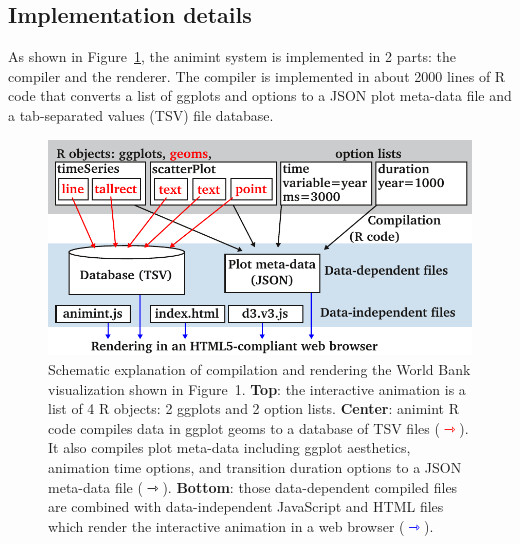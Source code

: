 \documentclass[journal]{vgtc}\usepackage[]{graphicx}\usepackage[]{color}
\begin{document}
\subsection{Implementation details}
\label{sec:implementation}

As shown in Figure~\ref{fig:design}, the animint system is implemented
in 2 parts: the compiler and the renderer. The compiler is implemented in about 
2000 lines of R code that converts a list of ggplots and options to a JSON 
plot meta-data file and a tab-separated values (TSV) file database.

\begin{figure}[htp]
  \centering
  \includegraphics[width=\columnwidth]{figure-design}
  \caption{Schematic explanation of compilation and rendering the
    World Bank visualization shown in Figure~1. \textbf{Top}: the
    interactive animation is a list of 4 R objects: 2 ggplots and 2
    option lists. \textbf{Center}: animint R code compiles data in
    ggplot geoms to a database of TSV files
    (\textcolor{red}{$\rightarrowtriangle$}). It also compiles plot
    meta-data including ggplot aesthetics, animation time
    options, and transition duration options to a JSON meta-data file
    ($\rightarrowtriangle$). \textbf{Bottom}: those data-dependent
    compiled files are combined with data-independent JavaScript and
    HTML files which render the interactive animation in a web browser
    (\textcolor{blue}{$\rightarrowtriangle$}).}
  \label{fig:design}
\end{figure}
\end{document}
